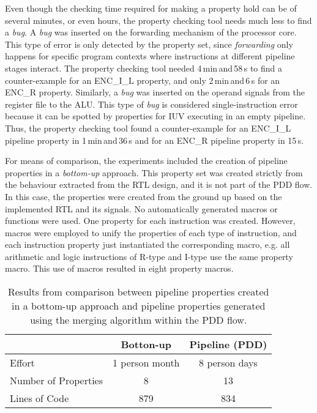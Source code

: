 Even though the checking time required for making a property hold can be of several minutes, or even hours, the property checking tool needs much less to find a \textit{bug}. A \textit{bug} was inserted on the forwarding mechanism of the processor core. This type of error is only detected by the \SSQED{} property set, since \textit{forwarding} only happens for specific program contexts where instructions at different pipeline stages interact. The property checking tool needed 4\,min\,and\,58\,s to find a counter-example for an ENC\_I\_L \SSQED{} property, and only 2\,min\,and\,6\,s for an ENC\_R \SSQED{} property. Similarly, a \textit{bug} was inserted on the operand signals from the register file to the ALU. This type of \textit{bug} is considered single-instruction error because it can be spotted by properties for IUV executing in an empty pipeline. Thus, the property checking tool found a counter-example for an ENC\_I\_L pipeline property in 1\,min\,and\,36\,s and for an ENC\_R pipeline property in 15\,s.

For means of comparison, the experiments included the creation of pipeline properties in a \textit{bottom-up} approach. This property set was created strictly from the behaviour extracted from the RTL design, and it is not part of the PDD flow. In this case, the properties were created from the ground up based on the implemented RTL and its signals. No automatically generated macros or functions were used. One property for each instruction was created. However, macros were employed to unify the properties of each type of instruction, and each instruction property just instantiated the corresponding macro, e.g. all arithmetic and logic instructions of R-type and I-type use the same property macro. This use of macros resulted in eight property macros.

\begin{table*}[htb!] 
	\centering 
	\caption{Results from comparison between pipeline properties created in a bottom-up approach and pipeline properties generated using the merging algorithm within the PDD flow.} 
	\label{tab:bottom-up-ppt-resutls}
	\begin{tabular}{p{5cm} c c} 
		  &  \textbf{Botton-up} & \textbf{Pipeline (PDD)} \\     
		\hline	
		Effort  &  1 person month &  8 person days\\
		Number of Properties  &  8 & 13 \\
		Lines of Code  & 879  &  834\\
	\end{tabular}
\end{table*}

